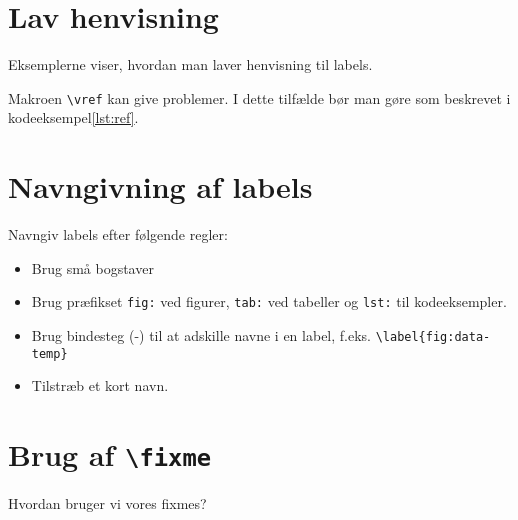 \documentclass[simple,final]{../mypaper}
\begin{document}
\section{Lav henvisning}

Eksemplerne viser, hvordan man laver henvisning til labels.



Makroen \texttt{\textbackslash vref} kan give problemer. I dette tilfælde
bør man gøre som beskrevet i kodeeksempel\vref{lst:ref}.




\section{Navngivning af labels}

Navngiv labels efter følgende regler:

\begin{itemize}
\item Brug små bogstaver
\item Brug præfikset \texttt{fig:} ved figurer, \texttt{tab:} ved
  tabeller og \texttt{lst:} til kodeeksempler.
\item Brug bindesteg (-) til at adskille navne i en label,
  f.eks. \texttt{\textbackslash label\{fig:data-temp\}}
\item Tilstræb et kort navn.
\end{itemize}


\section{Brug af \texttt{\textbackslash fixme}}

Hvordan bruger vi vores fixmes?
\end{document}
